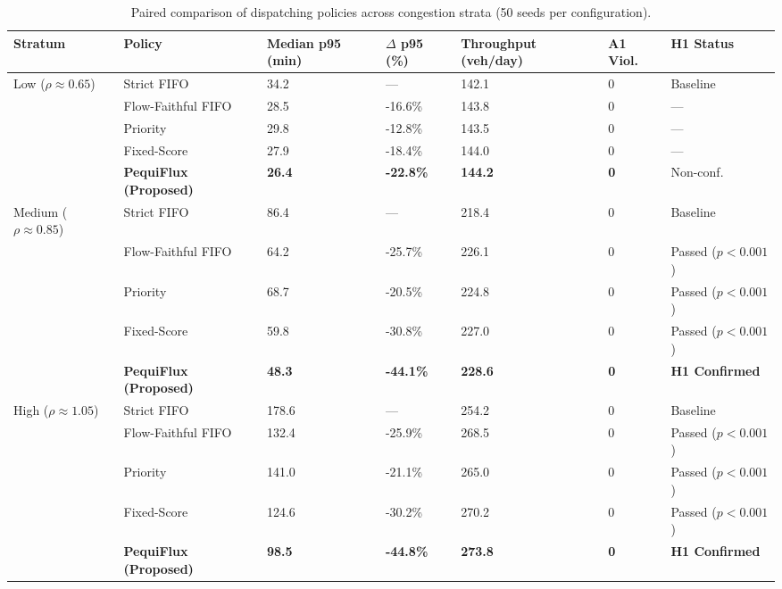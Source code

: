 \documentclass[11pt,a4paper]{article}
\begin{document}
\begin{table}[H]
\centering
\small
\renewcommand{\arraystretch}{1.2}
\caption{Paired comparison of dispatching policies across congestion strata (50 seeds per configuration).}
\label{tab:results-summary}
\begin{tabularx}{\textwidth}{@{}P{2.2cm}P{3.4cm}C{1.8cm}C{1.6cm}C{2.0cm}C{1.2cm}Y@{}}
\toprule
{}
\textbf{Stratum} & \textbf{Policy} & \textbf{Median p95 (min)} & \textbf{$\Delta$ p95 (\%)} & \textbf{Throughput (veh/day)} & \textbf{A1 Viol.} & \textbf{H1 Status} \\
\midrule
Low ($\rho \approx 0.65$) & Strict FIFO & 34.2 & --- & 142.1 & 0 & Baseline \\
 & Flow-Faithful FIFO & 28.5 & -16.6\% & 143.8 & 0 & --- \\
 & Priority & 29.8 & -12.8\% & 143.5 & 0 & --- \\
 & Fixed-Score & 27.9 & -18.4\% & 144.0 & 0 & --- \\
 & \textbf{PequiFlux (Proposed)} & \textbf{26.4} & \textbf{-22.8\%} & \textbf{144.2} & \textbf{0} & Non-conf. \\
\midrule
Medium ($\rho \approx 0.85$) & Strict FIFO & 86.4 & --- & 218.4 & 0 & Baseline \\
 & Flow-Faithful FIFO & 64.2 & -25.7\% & 226.1 & 0 & Passed ($p < 0.001$) \\
 & Priority & 68.7 & -20.5\% & 224.8 & 0 & Passed ($p < 0.001$) \\
 & Fixed-Score & 59.8 & -30.8\% & 227.0 & 0 & Passed ($p < 0.001$) \\
 & \textbf{PequiFlux (Proposed)} & \textbf{48.3} & \textbf{-44.1\%} & \textbf{228.6} & \textbf{0} & \textbf{H1 Confirmed} \\
\midrule
High ($\rho \approx 1.05$) & Strict FIFO & 178.6 & --- & 254.2 & 0 & Baseline \\
 & Flow-Faithful FIFO & 132.4 & -25.9\% & 268.5 & 0 & Passed ($p < 0.001$) \\
 & Priority & 141.0 & -21.1\% & 265.0 & 0 & Passed ($p < 0.001$) \\
 & Fixed-Score & 124.6 & -30.2\% & 270.2 & 0 & Passed ($p < 0.001$) \\
 & \textbf{PequiFlux (Proposed)} & \textbf{98.5} & \textbf{-44.8\%} & \textbf{273.8} & \textbf{0} & \textbf{H1 Confirmed} \\
\bottomrule
\end{tabularx}
\end{table}
\end{document}
